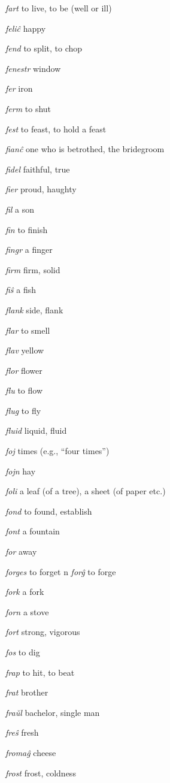 \begin{landscape}
\begin{multicols}{5}
\begin{outdent}{1em}
\emph{fart}  to live, to be (well or ill)

\emph{feliĉ } happy

\emph{fend}  to split, to chop

\emph{fenestr}  window

\emph{fer}  iron

\emph{ferm } to shut

\emph{fest } to feast, to hold a feast

\emph{fianĉ } one who is betrothed, the bridegroom

\emph{fidel}  faithful, true

\emph{fier}  proud, haughty

\emph{fil } a son

\emph{fin } to finish

\emph{fingr}  a finger

\emph{firm}  firm, solid

\emph{fiŝ  }a fish

\emph{flank}  side, flank

\emph{flar } to smell

\emph{flav } yellow

\emph{flor}  flower

\emph{flu  }to flow

\emph{flug  }to fly

\emph{fluid}  liquid, fluid

\emph{foj } times (e.g., ``four times'')

\emph{fojn}  hay

\emph{foli}  a leaf (of a tree), a sheet (of paper etc.)

\emph{fond}  to found, establish

\emph{font}  a fountain

\emph{for } away

\emph{forges}  to forget
n
\emph{forĝ } to forge

\emph{fork}  a fork

\emph{forn}  a stove

\emph{fort } strong, vigorous

\emph{fos } to dig

\emph{frap}  to hit, to beat

\emph{frat}  brother

\emph{fraŭl}  bachelor, single man

\emph{freŝ}  fresh

\emph{fromaĝ } cheese

\emph{frost}  frost, coldness


\end{outdent}
\end{multicols}
\end{landscape}
